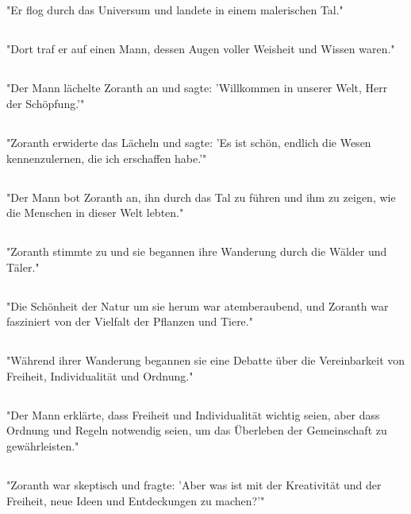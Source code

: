 \documentclass{article}
\begin{document}
\subsection{}
"Er flog durch das Universum und landete in einem malerischen Tal."
\subsection{}
"Dort traf er auf einen Mann, dessen Augen voller Weisheit und Wissen waren."
\subsection{}
"Der Mann lächelte Zoranth an und sagte: 'Willkommen in unserer Welt, Herr der Schöpfung.'"
\subsection{}
"Zoranth erwiderte das Lächeln und sagte: 'Es ist schön, endlich die Wesen kennenzulernen, die ich erschaffen habe.'"
\subsection{}
"Der Mann bot Zoranth an, ihn durch das Tal zu führen und ihm zu zeigen, wie die Menschen in dieser Welt lebten."
\subsection{}
"Zoranth stimmte zu und sie begannen ihre Wanderung durch die Wälder und Täler."
\subsection{}
"Die Schönheit der Natur um sie herum war atemberaubend, und Zoranth war fasziniert von der Vielfalt der Pflanzen und Tiere."
\subsection{}
"Während ihrer Wanderung begannen sie eine Debatte über die Vereinbarkeit von Freiheit, Individualität und Ordnung."
\subsection{}
"Der Mann erklärte, dass Freiheit und Individualität wichtig seien, aber dass Ordnung und Regeln notwendig seien, um das Überleben der Gemeinschaft zu gewährleisten."
\subsection{}
"Zoranth war skeptisch und fragte: 'Aber was ist mit der Kreativität und der Freiheit, neue Ideen und Entdeckungen zu machen?'"
\end{document}
